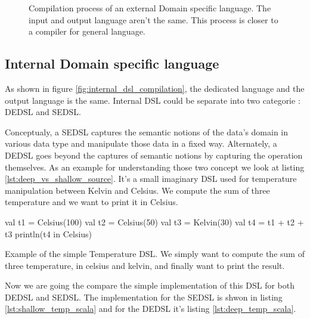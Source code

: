 \begin{figure}[ht]
  \centering
  \caption[Compilation process of an external \gls{DSL}]{Compilation process of
    an external Domain specific language. The input and output language aren't
    the same. This process is closer to a compiler for general language.}
  \label{fig:external_dsl_compilation}
\end{figure}

\subsection{Internal Domain specific language}
\label{sec:internal_dsl}

As shown in figure \ref{fig:internal_dsl_compilation}, the dedicated language
and the output language is the same. Internal \gls{DSL} could be separate into
two categorie : \gls{DEDSL} and \gls{SEDSL}.

Conceptualy, a \gls{SEDSL} captures the semantic notions of the data's domain in
various data type and manipulate those data in a fixed way. Alternately, a
\gls{DEDSL} goes beyond the captures of semantic notions by capturing the
operation themselves. As an example for understanding those two concept we look
at listing \ref{lst:deep_vs_shallow_source}. It's a small imaginary DSL used for
temperature manipulation between Kelvin and Celsius. We compute the sum
of three temperature and we want to print it in Celsius.

\begin{listing}[ht]
\centering
\begin{scalacode}
val t1 = Celsius(100)
val t2 = Celsius(50)
val t3 = Kelvin(30)
val t4 = t1 + t2 + t3
println(t4 in Celsius)
\end{scalacode}
\caption[Usage of the simple Temperature \gls{DSL}]{Example of the simple
Temperature \gls{DSL}. We simply want to compute the sum of three temperature,
in celsius and kelvin, and finally want to print the result.}
\label{lst:deep_vs_shallow_source}
\end{listing}

Now we are going the compare the simple implementation of this \gls{DSL} for
both \gls{DEDSL} and \gls{SEDSL}. The implementation for the \gls{SEDSL} is
shwon in listing \ref{lst:shallow_temp_scala} and for the \gls{DEDSL} it's
listing \ref{lst:deep_temp_scala}.

